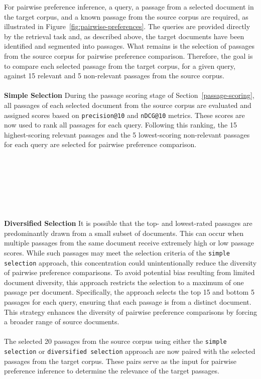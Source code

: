 For pairwise preference inference, a query, a passage from a selected document in the target corpus, and a known passage from the source corpus are required, as illustrated in Figure~\ref{fig:pairwise-preferences}. The queries are provided directly by the retrieval task and, as described above, the target documents have been identified and segmented into passages. What remains is the selection of passages from the source corpus for pairwise preference comparison. Therefore, the goal is to compare each selected passage from the target corpus, for a given query, against 15 relevant and 5 non-relevant passages from the source corpus.
\\\\
\textbf{Simple Selection} During the passage scoring stage of Section~\ref{passage-scoring}, all passages of each selected document from the source corpus are evaluated and assigned scores based on \texttt{precision@10} and \texttt{nDCG@10} metrics. These scores are now used to rank all passages for each query. Following this ranking, the 15 highest-scoring relevant passages and the 5 lowest-scoring non-relevant passages for each query are selected for pairwise preference comparison.
\\\\\\\\\\\\\\\\
\textbf{Diversified Selection} It is possible that the top- and lowest-rated passages are predominantly drawn from a small subset of documents. This can occur when multiple passages from the same document receive extremely high or low passage scores. While such passages may meet the selection criteria of the \texttt{simple selection} approach, this concentration could unintentionally reduce the diversity of pairwise preference comparisons. To avoid potential bias resulting from limited document diversity, this approach restricts the selection to a maximum of one passage per document. Specifically, the approach selects the top 15 and bottom 5 passages for each query, ensuring that each passage is from a distinct document. This strategy enhances the diversity of pairwise preference comparisons by forcing a broader range of source documents.
\\\\
The selected 20 passages from the source corpus using either the \texttt{simple selection} or \texttt{diversified selection} approach are now paired with the selected passages from the target corpus. These pairs serve as the input for pairwise preference inference to determine the relevance of the target passages.


